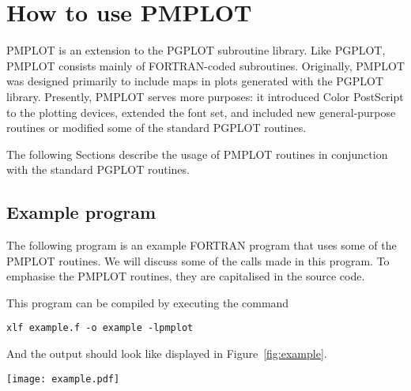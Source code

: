 \documentclass[titlepage,a4paper]{article}
\begin{document}
\section{How to use PMPLOT}
PMPLOT is an extension to the PGPLOT subroutine library. Like PGPLOT,
PMPLOT consists mainly of FORTRAN-coded subroutines. Originally, PMPLOT was
designed primarily to include maps in plots generated with the PGPLOT library.
Presently, PMPLOT serves more purposes: it introduced Color PostScript to
the plotting devices, extended the font set, and included new general-purpose
routines or modified some of the standard PGPLOT routines.

The following Sections describe the usage of PMPLOT routines in conjunction
with the standard PGPLOT routines.

\subsection{Example program}
The following program is an example FORTRAN program that uses some of the
PMPLOT routines. We will discuss some of the calls made in this program.
To emphasise the PMPLOT routines, they are capitalised in the source code.

\medskip
This program can be compiled by executing the command
\begin{verbatim}
xlf example.f -o example -lpmplot
\end{verbatim}
And the output should look like displayed in Figure~\ref{fig:example}.

\begin{figure*}
\texttt{[image: example.pdf]}
\caption{Output of {\tt example.f}.}
\label{fig:example}
\end{figure*}
\end{document}
